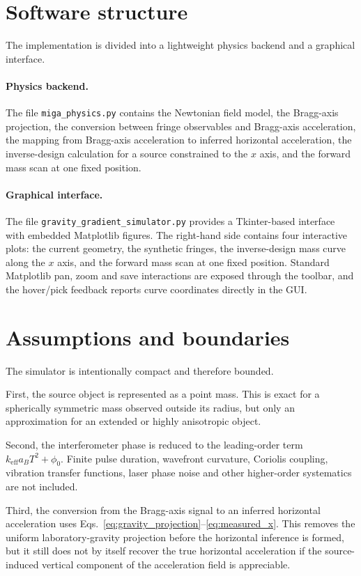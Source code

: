 \documentclass[11pt]{article}
\begin{document}
\section{Software structure}

The implementation is divided into a lightweight physics backend and a graphical interface.

\paragraph{Physics backend.}
The file \texttt{miga\_physics.py} contains the Newtonian field model, the Bragg-axis projection, the conversion between fringe observables and Bragg-axis acceleration, the mapping from Bragg-axis acceleration to inferred horizontal acceleration, the inverse-design calculation for a source constrained to the $x$ axis, and the forward mass scan at one fixed position.

\paragraph{Graphical interface.}
The file \texttt{gravity\_gradient\_simulator.py} provides a Tkinter-based interface with embedded Matplotlib figures. The right-hand side contains four interactive plots: the current geometry, the synthetic fringes, the inverse-design mass curve along the $x$ axis, and the forward mass scan at one fixed position. Standard Matplotlib pan, zoom and save interactions are exposed through the toolbar, and the hover/pick feedback reports curve coordinates directly in the GUI.

\section{Assumptions and boundaries}

The simulator is intentionally compact and therefore bounded.

First, the source object is represented as a point mass. This is exact for a spherically symmetric mass observed outside its radius, but only an approximation for an extended or highly anisotropic object.

Second, the interferometer phase is reduced to the leading-order term $k_{\mathrm{eff}} a_B T^2 + \phi_0$. Finite pulse duration, wavefront curvature, Coriolis coupling, vibration transfer functions, laser phase noise and other higher-order systematics are not included.

Third, the conversion from the Bragg-axis signal to an inferred horizontal acceleration uses Eqs.~\eqref{eq:gravity_projection}--\eqref{eq:measured_x}. This removes the uniform laboratory-gravity projection before the horizontal inference is formed, but it still does not by itself recover the true horizontal acceleration if the source-induced vertical component of the acceleration field is appreciable.
\end{document}
